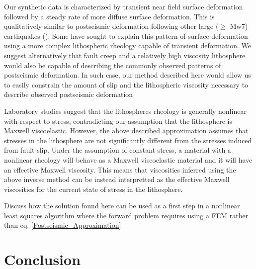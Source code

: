 \documentclass[12pt]{article}
\begin{document}
Our synthetic data is characterized by transient near field surface
deformation followed by a steady rate of more diffuse surface
deformation.  This is qualitatively similar to postseismic
deformation following other large ($\geq$ Mw7) earthquakes
(\citep{P2003,P2005,R2007,R2015}).  Some have sought to explain this
pattern of surface deformation using a more complex lithospheric
rheology capable of transient deformation. We suggest
alternatively that fault creep and a relatively high viscosity
lithosphere would also be capable of describing the commonly observed
patterns of postseismic deformation.  In such case, our method
described here would allow us to easily constrain the amount of slip
and the lithospheric viscosity necessary to describe observed
postseismic deformation

Laboratory studies suggest that the lithospheres rheology is generally
nonlinear with respect to stress, contradicting our assumption that
the lithosphere is Maxwell viscoelastic.  However, the above described
approximation assumes that stresses in the lithosphere are not
significantly different from the stresses induced from fault slip.
Under the assumption of constant stress, a material with a nonlinear
rheology will behave as a Maxwell viscoelastic material and it will
have an effective Maxwell viscosity.  This means that viscosities
inferred using the above inverse method can be instead interpretted as
the effective Maxwell viscosities for the current state of stress in
the lithosphere.

Discuss how the solution found here can be used as a first step in a
nonlinear least squares algorithm where the forward problem requires
using a FEM rather than eq. \ref{Postseismic_Approximation}
\section{Conclusion}
\end{document}
